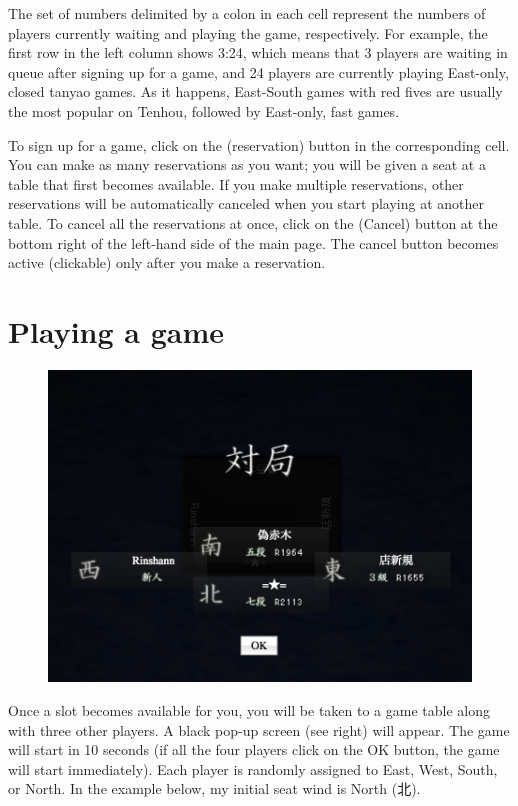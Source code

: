 \bigskip
The set of numbers delimited by a colon in each cell represent the numbers of players currently waiting and playing the game, respectively. For example, the first row in the left column shows 3:24, which means that 3 players are waiting in queue after signing up for a game, and 24 players are currently playing East-only, closed {\jap tanyao} games. As it happens, East-South games with red fives are usually the most popular on {\jap Tenhou}, followed by East-only, fast games.

\bigskip
To sign up for a game, click on the  (reservation) button in the corresponding cell. You can make as many reservations as you want; you will be given a seat at a table that first becomes available. If you make multiple reservations, other reservations will be automatically canceled when you start playing at another table. To cancel all the reservations at once, click on the  (Cancel) button at the bottom right of the left-hand side of the main page. The cancel button becomes active (clickable) only after you make a reservation.

\newpage
\section{Playing a game}

\begin{figure}
\vspace{-20pt}
\begin{center}
\includegraphics[width=.45\textwidth,clip]{figs/taikyoku}
\end{center}
\vspace{-20pt}
\end{figure}

Once a slot becomes available for you, you will be taken to a game table along with three other players. A black pop-up screen (see right) will appear. The game will start in 10 seconds (if all the four players click on the OK button, the game will start immediately). Each player is randomly assigned to East, West, South, or North. In the example below, my initial seat wind is North (北).

